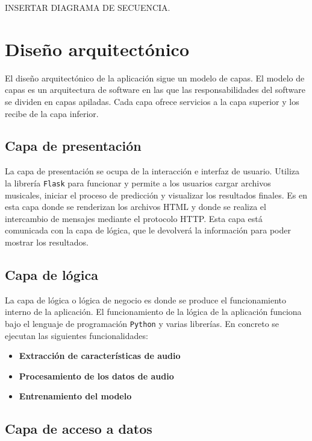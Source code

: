 INSERTAR DIAGRAMA DE SECUENCIA.

\section{Diseño arquitectónico}

El diseño arquitectónico de la aplicación sigue un modelo de capas.
El modelo de capas es un arquitectura de software en las que las responsabilidades del software se dividen en capas apiladas. Cada capa ofrece servicios a la capa superior y los recibe de la capa inferior.

\subsection{Capa de presentación}

La capa de presentación se ocupa de la interacción e interfaz de usuario. Utiliza la librería \texttt{Flask} para funcionar y permite a los usuarios cargar archivos musicales, iniciar el proceso de predicción y visualizar los resultados finales.
Es en esta capa donde se renderizan los archivos HTML y donde se realiza el intercambio de mensajes mediante el protocolo HTTP. Esta capa está comunicada con la capa de lógica, que le devolverá la información para poder mostrar los resultados.

\subsection{Capa de lógica}

La capa de lógica o lógica de negocio es donde se produce el funcionamiento interno de la aplicación. El funcionamiento de la lógica de la aplicación funciona bajo el lenguaje de programación \texttt{Python} y varias librerías. En concreto se ejecutan las siguientes funcionalidades:

\begin{itemize}
\tightlist

\item \textbf{Extracción de características de audio}

\item \textbf{Procesamiento de los datos de audio}

\item \textbf{Entrenamiento del modelo}

\end{itemize}

\subsection{Capa de acceso a datos}


